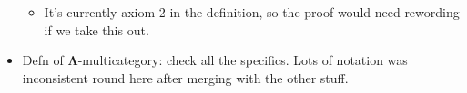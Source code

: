 \documentclass{amsart}
\begin{document}
\begin{itemize}
\begin{itemize}
		\item It's currently axiom 2 in the definition, so the proof would need rewording if we take this out.
	\end{itemize}
\item Defn of $\mathbf{\Lambda}$-multicategory: check all the specifics. Lots of notation was inconsistent round here after merging with the other stuff.
\end{itemize}





\end{document}
